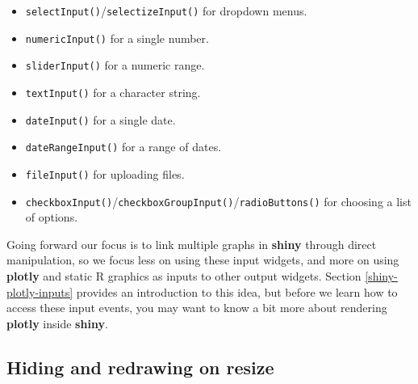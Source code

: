 \documentclass[
  12pt,
]{krantz}
\providecommand{\tightlist}{%
  \setlength{\itemsep}{0pt}\setlength{\parskip}{0pt}}
\begin{document}
\begin{itemize}
\tightlist
\item
  \texttt{selectInput()}/\texttt{selectizeInput()} for dropdown menus.
\item
  \texttt{numericInput()} for a single number.
\item
  \texttt{sliderInput()} for a numeric range.
\item
  \texttt{textInput()} for a character string.
\item
  \texttt{dateInput()} for a single date.
\item
  \texttt{dateRangeInput()} for a range of dates.
\item
  \texttt{fileInput()} for uploading files.
\item
  \texttt{checkboxInput()}/\texttt{checkboxGroupInput()}/\texttt{radioButtons()} for choosing a list of options.
\end{itemize}

Going forward our focus is to link multiple graphs in \textbf{shiny} through direct manipulation, so we focus less on using these input widgets, and more on using \textbf{plotly} and static R graphics as inputs to other output widgets. Section \ref{shiny-plotly-inputs} provides an introduction to this idea, but before we learn how to access these input events, you may want to know a bit more about rendering \textbf{plotly} inside \textbf{shiny}.

\hypertarget{hiding-and-redrawing-on-resize}{%
\subsection{Hiding and redrawing on resize}\label{hiding-and-redrawing-on-resize}}

\end{document}
